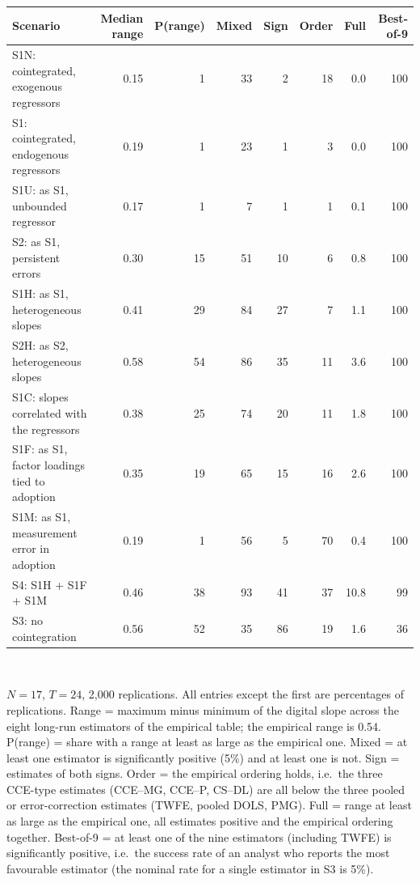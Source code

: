 \begin{tabular}{p{5.4cm}rrrrrrr}\toprule
Scenario & Median range & P(range) & Mixed & Sign & Order & Full & Best-of-9 \\
\midrule
S1N: cointegrated, exogenous regressors & 0.15 & 1 & 33 & 2 & 18 & 0.0 & 100 \\
S1: cointegrated, endogenous regressors & 0.19 & 1 & 23 & 1 & 3 & 0.0 & 100 \\
S1U: as S1, unbounded regressor & 0.17 & 1 & 7 & 1 & 1 & 0.1 & 100 \\
S2: as S1, persistent errors & 0.30 & 15 & 51 & 10 & 6 & 0.8 & 100 \\
S1H: as S1, heterogeneous slopes & 0.41 & 29 & 84 & 27 & 7 & 1.1 & 100 \\
S2H: as S2, heterogeneous slopes & 0.58 & 54 & 86 & 35 & 11 & 3.6 & 100 \\
S1C: slopes correlated with the regressors & 0.38 & 25 & 74 & 20 & 11 & 1.8 & 100 \\
S1F: as S1, factor loadings tied to adoption & 0.35 & 19 & 65 & 15 & 16 & 2.6 & 100 \\
S1M: as S1, measurement error in adoption & 0.19 & 1 & 56 & 5 & 70 & 0.4 & 100 \\
S4: S1H + S1F + S1M & 0.46 & 38 & 93 & 41 & 37 & 10.8 & 99 \\
S3: no cointegration & 0.56 & 52 & 35 & 86 & 19 & 1.6 & 36 \\
\bottomrule\end{tabular}
\\[3pt]\begin{minipage}{\tablewidth}\footnotesize $N=17$, $T=24$, 2,000 replications. All entries except the first are percentages of replications. Range = maximum minus minimum of the digital slope across the eight long-run estimators of the empirical table; the empirical range is 0.54. P(range) = share with a range at least as large as the empirical one. Mixed = at least one estimator is significantly positive (5\%) and at least one is not. Sign = estimates of both signs. Order = the empirical ordering holds, i.e.\ the three CCE-type estimates (CCE--MG, CCE--P, CS--DL) are all below the three pooled or error-correction estimates (TWFE, pooled DOLS, PMG). Full = range at least as large as the empirical one, all estimates positive and the empirical ordering together. Best-of-9 = at least one of the nine estimators (including TWFE) is significantly positive, i.e.\ the success rate of an analyst who reports the most favourable estimator (the nominal rate for a single estimator in S3 is 5\%).\end{minipage}
